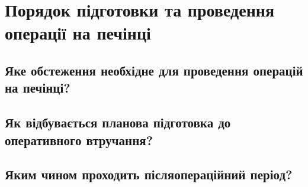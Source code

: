 \chapter{Порядок підготовки та проведення операції на печінці}

\section{Яке обстеження необхідне для проведення операцій на печінці?}

\section{Як відбувається планова підготовка до оперативного втручання?}

\section{Яким чином проходить післяопераційний період?}